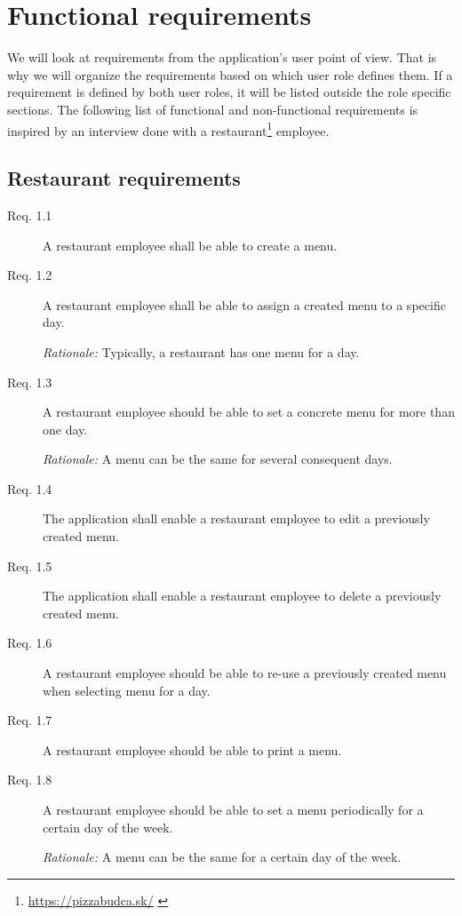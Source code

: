 \section{Functional requirements}
We will look at requirements from the application's user point of view.
That is why we will organize the requirements based on which user role defines them.
If a requirement is defined by both user roles, it will be listed outside the role specific sections.
The following list of functional and non-functional requirements is inspired by an interview done with a restaurant\footnote{\url{https://pizzabudca.sk/}  \label{fnlabel}} employee.

\subsection{Restaurant requirements}
\begin{description}
    \item [Req. 1.1] A restaurant employee shall be able to create a menu.
    \item [Req. 1.2] A restaurant employee shall be able to assign a created menu to a specific day.

    \emph{Rationale:} Typically, a restaurant has one menu for a day.
    \item[Req. 1.3] A restaurant employee should be able to set a concrete menu for more than one day.

    \emph{Rationale:} A menu can be the same for several consequent days.
    \item [Req. 1.4] The application shall enable a restaurant employee to edit a previously created menu.
    \item [Req. 1.5] The application shall enable a restaurant employee to delete a previously created menu.
    \item [Req. 1.6] A restaurant employee should be able to re-use a previously created menu when selecting menu for a day.
    \item [Req. 1.7] A restaurant employee should be able to print a menu.
    \item [Req. 1.8] A restaurant employee should be able to set a menu periodically for a certain day of the week.

    \emph{Rationale:} A menu can be the same for a certain day of the week. 
\end{description}


